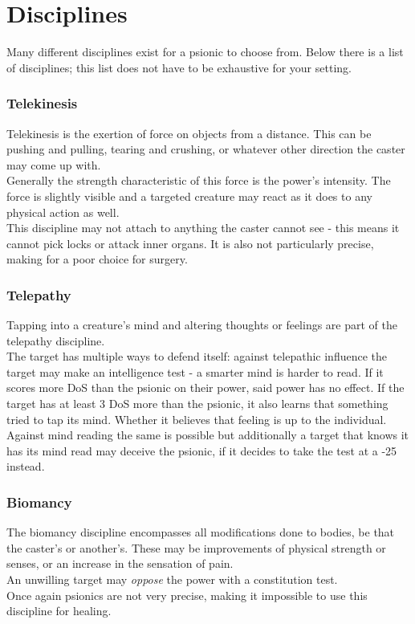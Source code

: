 \documentclass[12pt,a4paper,openany,usenames,dvipsnames]{book}
\begin{document}
	\section{Disciplines}
	\begin{exampleblock}
		Many different disciplines exist for a psionic to choose from.
		Below there is a list of disciplines;
			this list does not have to be exhaustive for your setting.
	\end{exampleblock}
	\subsubsection*{Telekinesis}
	Telekinesis is the exertion of force on objects from a distance.
	This can be pushing and pulling, tearing and crushing, or whatever other direction the caster may come up with.\\
	Generally the strength characteristic of this force is the power's intensity. The force is slightly visible and a targeted creature may react as it does to any physical action as well.\\
	This discipline may not attach to anything the caster cannot see - this means it cannot pick locks or attack inner organs. It is also not particularly precise, making for a poor choice for surgery.
	\subsubsection*{Telepathy}
	Tapping into a creature's mind and altering thoughts or feelings are part of the telepathy discipline.\\
	The target has multiple ways to defend itself: against telepathic influence the target may make an intelligence test - a smarter mind is harder to read.
	If it scores more DoS than the psionic on their power, said power has no effect. If the target has at least 3 DoS more than the psionic, it also learns that something tried to tap its mind. Whether it believes that feeling is up to the individual.\\
	Against mind reading the same is possible but additionally a target that knows it has its mind read may deceive the psionic, if it decides to take the test at a -25 instead.
	\subsubsection*{Biomancy}
	The biomancy discipline encompasses all modifications done to bodies, be that the caster's or another's. These may be improvements of physical strength or senses, or an increase in the sensation of pain.\\
	An unwilling target may \emph{oppose} the power with a constitution test.\\
	Once again psionics are not very precise, making it impossible to use this discipline for healing.
\end{document}
